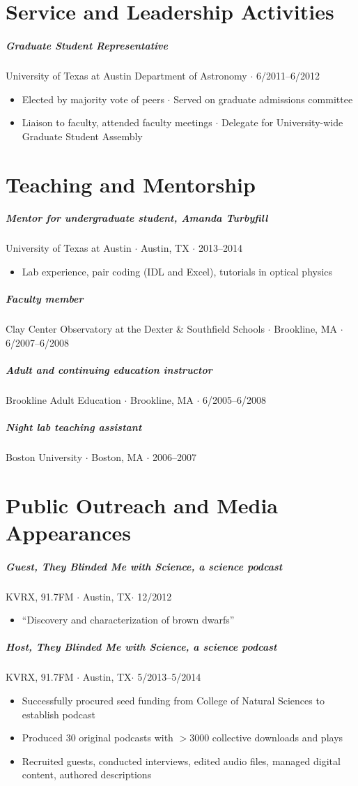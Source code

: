 \documentclass[10pt,letterpaper]{article}
\begin{document}
\section*{Service and Leadership Activities}

\subparagraph{Graduate Student Representative}
University of Texas at Austin Department of Astronomy $\cdot$ 6/2011--6/2012
\begin{itemize}
    \item Elected by majority vote of peers $\cdot$ Served on graduate admissions committee
    \item Liaison to faculty, attended faculty meetings $\cdot$ Delegate for University-wide Graduate Student Assembly
\end{itemize}

\section*{Teaching and Mentorship}

\subparagraph{Mentor for undergraduate student, Amanda Turbyfill} 
University of Texas at Austin $\cdot$ Austin, TX $\cdot$ 2013--2014
	\begin{itemize}
	    \item Lab experience, pair coding (IDL and Excel), tutorials in optical physics
	\end{itemize}

\subparagraph{Faculty member}
Clay Center Observatory at the Dexter \& Southfield Schools  $\cdot$ Brookline, MA $\cdot$ 6/2007--6/2008

\subparagraph{Adult and continuing education instructor}
Brookline Adult Education  $\cdot$ Brookline, MA $\cdot$ 6/2005--6/2008

\subparagraph{Night lab teaching assistant} 
Boston University $\cdot$ Boston, MA $\cdot$ 2006--2007

\section*{Public Outreach and Media Appearances}

\subparagraph{Guest, They Blinded Me with Science, a science podcast}
KVRX, 91.7FM $\cdot$ Austin, TX$\cdot$ 12/2012
	\begin{itemize}
	    \item ``Discovery and characterization of brown dwarfs''
	\end{itemize}
	
\subparagraph{Host, They Blinded Me with Science, a science podcast}
KVRX, 91.7FM $\cdot$ Austin, TX$\cdot$ 5/2013--5/2014
	\begin{itemize}
	    \item Successfully procured seed funding from College of Natural Sciences to establish podcast
	    \item Produced 30 original podcasts with $>3000$ collective downloads and plays
	    \item Recruited guests, conducted interviews, edited audio files, managed digital content, authored descriptions
	\end{itemize}
\end{document}
